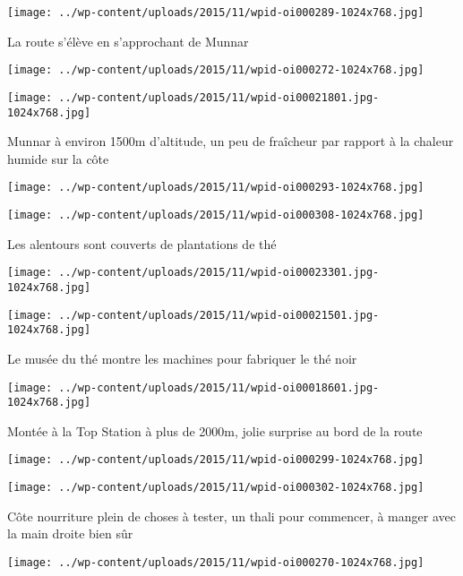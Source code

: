  \newline
\centerline{\texttt{[image: ../wp-content/uploads/2015/11/wpid-oi000289-1024x768.jpg]} } 
 \newline
 La route s'élève en s'approchant de Munnar \newline
 \newline
\centerline{\texttt{[image: ../wp-content/uploads/2015/11/wpid-oi000272-1024x768.jpg]} } 
 \newline
 \newline
\centerline{\texttt{[image: ../wp-content/uploads/2015/11/wpid-oi00021801.jpg-1024x768.jpg]} } 
 \newline
 Munnar à environ 1500m d'altitude, un peu de fraîcheur par rapport à la chaleur humide sur la côte \newline
 \newline
\centerline{\texttt{[image: ../wp-content/uploads/2015/11/wpid-oi000293-1024x768.jpg]} } 
 \newline
 \newline
\centerline{\texttt{[image: ../wp-content/uploads/2015/11/wpid-oi000308-1024x768.jpg]} } 
 \newline
 Les alentours sont couverts de plantations de thé \newline
 \newline
\centerline{\texttt{[image: ../wp-content/uploads/2015/11/wpid-oi00023301.jpg-1024x768.jpg]} } 
 \newline
 \newline
\centerline{\texttt{[image: ../wp-content/uploads/2015/11/wpid-oi00021501.jpg-1024x768.jpg]} } 
 \newline
 Le musée du thé montre les machines pour fabriquer le thé noir \newline
 \newline
\centerline{\texttt{[image: ../wp-content/uploads/2015/11/wpid-oi00018601.jpg-1024x768.jpg]} } 
 \newline
 Montée à la Top Station à plus de 2000m, jolie surprise au bord de la route \newline
 \newline
\centerline{\texttt{[image: ../wp-content/uploads/2015/11/wpid-oi000299-1024x768.jpg]} } 
 \newline
 \newline
\centerline{\texttt{[image: ../wp-content/uploads/2015/11/wpid-oi000302-1024x768.jpg]} } 
 \newline
 Côte nourriture plein de choses à tester, un thali pour commencer, à manger avec la main droite bien sûr \newline
 \newline
\centerline{\texttt{[image: ../wp-content/uploads/2015/11/wpid-oi000270-1024x768.jpg]} } 
 \newline

\newpage
 
